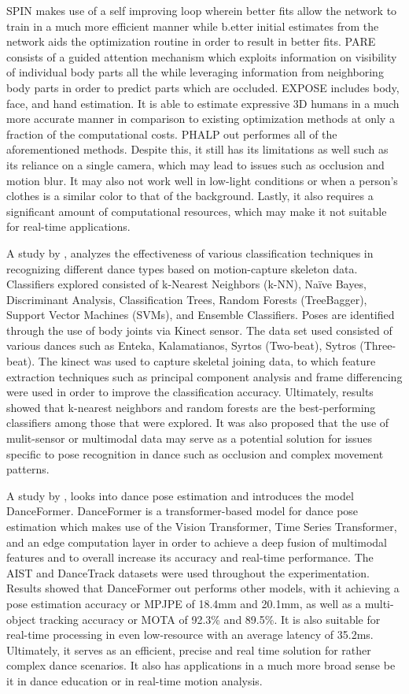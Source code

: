 SPIN makes use of a self improving loop wherein better fits allow the network to train in a much more efficient manner while b.etter initial estimates from the network aids the optimization routine in order to result in better fits. 
	PARE consists of a guided attention mechanism which exploits information on visibility of individual body parts all the while leveraging information from neighboring body parts in order to predict parts which are occluded. 
EXPOSE includes body, face, and hand estimation. It is able to estimate expressive 3D humans in a much more accurate manner in comparison to existing optimization methods at only a fraction of the computational costs. 
PHALP out performes all of the aforementioned methods. Despite this, it still has its limitations as well such as its reliance on a single camera, which may lead to issues such as occlusion and motion blur. It may also not work well in low-light conditions or when a person's clothes is a similar color to that of the background. Lastly, it also requires a significant amount of computational resources, which may make it not suitable for real-time applications. 

A study by \citet{Protopapadakis2018dancepose}, analyzes the effectiveness of various classification techniques in  recognizing different dance types based on motion-capture skeleton data. Classifiers explored consisted of k-Nearest Neighbors (k-NN), Naïve Bayes, Discriminant Analysis, Classification Trees, Random Forests (TreeBagger), Support Vector Machines (SVMs), and Ensemble Classifiers. Poses are identified through the use of body joints via Kinect sensor. The data set used consisted of various dances such as Enteka, Kalamatianos, Syrtos (Two-beat), Sytros (Three-beat). The kinect was used to capture skeletal joining data, to which feature extraction techniques such as principal component analysis and frame differencing were used in order to improve the classification accuracy. Ultimately, results showed that k-nearest neighbors and random forests are the best-performing classifiers among those that were explored. It was also proposed that the use of mulit-sensor or multimodal data may serve as a potential solution for issues specific to pose recognition in dance such as occlusion and complex movement patterns. 

	A study by \citet{ZHAO202566}, looks into dance pose estimation and introduces the model DanceFormer. DanceFormer is a transformer-based model for dance pose estimation which makes use of the Vision Transformer, Time Series Transformer, and an edge computation layer in order to achieve a deep fusion of multimodal features and to overall increase its accuracy and real-time performance. The AIST and DanceTrack datasets were used throughout the experimentation. Results showed that DanceFormer out performs other models, with it achieving a pose estimation accuracy or MPJPE of 18.4mm and 20.1mm, as well as a multi-object tracking accuracy or MOTA of 92.3\% and 89.5\%. It is also suitable for real-time processing in even low-resource with an average latency of 35.2ms. Ultimately, it serves as an efficient, precise and real time solution for rather complex dance scenarios. It also has applications in a much more broad sense be it in dance education or in real-time motion analysis. 

